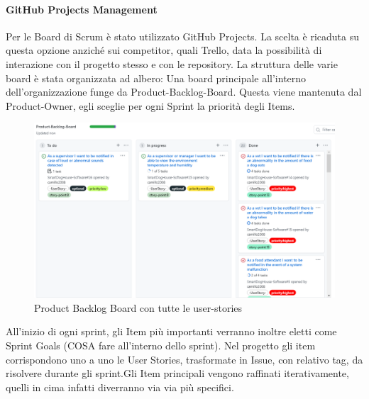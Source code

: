     \paragraph{GitHub Projects Management}
    Per le Board di Scrum è stato utilizzato GitHub Projects. La scelta è ricaduta su questa opzione anziché sui competitor, quali Trello, data la possibilità di interazione con il progetto stesso e con le repository. 
    La struttura delle varie board è stata organizzata ad albero:
    Una board principale all'interno dell'organizzazione funge da Product-Backlog-Board. Questa viene mantenuta dal Product-Owner, egli sceglie per ogni Sprint la priorità degli Items. 
    \begin{figure}[H]
        \caption{Product Backlog Board con tutte le user-stories}
        \centering
       \includegraphics[width=1\textwidth]{Images/productBacklogBoard.png}
    \end{figure}
    All'inizio di ogni sprint, gli Item più importanti verranno inoltre eletti come Sprint Goals (COSA fare all'interno dello sprint). 
    Nel progetto gli item corrispondono uno a uno le User Stories, trasformate in Issue, con relativo tag, da risolvere durante gli sprint.Gli Item principali vengono raffinati iterativamente, quelli in cima infatti diverranno via via più specifici.
    
